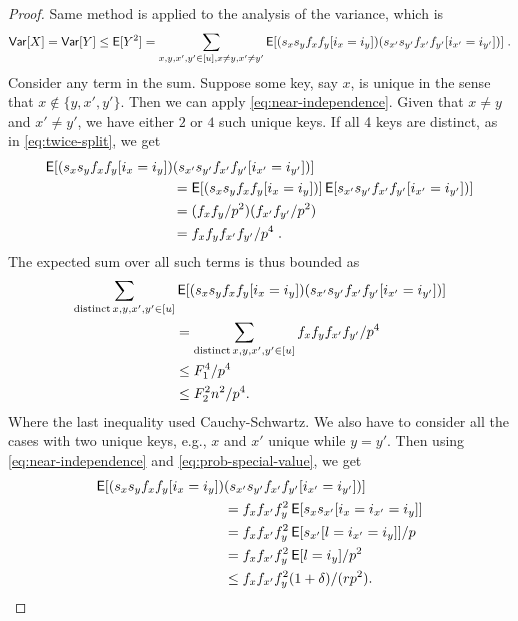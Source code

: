 \begin{proof}
    Same method is applied to the analysis of the variance, which is
    \[
        {\sf Var}[X]
            = {\sf Var}[Y]
            \le \operatorname*{\sf{E}}[Y^2]
            = \sum_{x,y,x',y' \in [u], x \neq y, x' \neq y'} \operatorname*{\sf{E}}[(s_x s_y f_x f_y [i_x = i_y]) (s_{x'} s_{y'} f_{x'} f_{y'}[i_{x'} = i_{y'}])]
        \; .
    \] 
    Consider any term in the sum. Suppose some key, say $x$, is unique in the
    sense that $x \not \in \{y,x',y'\}$. Then we can apply \cref{eq:near-independence}.
    Given that $x \neq y$ and $x'\neq y'$, we have either $2$ or $4$ such unique keys.
    If all 4 keys are distinct, as in \cref{eq:twice-split}, we get
    \begin{align*}
        \operatorname*{\sf{E}}[(s_x s_y f_x f_y [i_x = i_y]) &(s_{x'} s_{y'} f_{x'} f_{y'}[i_{x'} = i_{y'}])]
            \\&= \operatorname*{\sf{E}}[(s_x s_y f_x f_y [i_x = i_y])] \operatorname*{\sf{E}}[s_{x'} s_{y'} f_{x'} f_{y'}[i_{x'} = i_{y'}])]
            \\&= (f_x f_y/p^2)(f_{x'} f_{y'}/p^2)
            \\&= f_x f_y f_{x'} f_{y'}/p^4
        \; .
    \end{align*}
    The expected sum over all such terms is thus bounded
    as 
    \begin{equation}\begin{split}
        \sum_{{\rm distinct}\, x,y,x',y'\in[u]}& \operatorname*{\sf{E}}[(s_x s_y f_x f_y [i_x = i_y]) (s_{x'} s_{y'} f_{x'} f_{y'}[i_{x'} = i_{y'}])]
            \\&= \sum_{{\rm distinct}\,x,y,x',y'\in[u]} f_xf_yf_{x'}f_{y'}/p^4
            \\&\le F_1^4 /p^4
            \\&\le F_2^2 n^2/p^4.\label{eq:distinct}
    \end{split}\end{equation}
    Where the last inequality used Cauchy-Schwartz. We also have to consider all the cases with
    two unique keys, e.g., $x$ and $x'$ unique while $y=y'$. Then using \cref{eq:near-independence}
    and \cref{eq:prob-special-value}, we get
    \begin{align*}
        \E[(s_x s_y f_x f_y [i_x = i_y]) &(s_{x'} s_{y'} f_{x'} f_{y'}[i_{x'} = i_{y'}])]
            \\&= f_x f_{x'} f_y^2 \E[s_x s_{x'} [i_x = i_{x'} = i_y]]
            \\&= f_x f_{x'} f_y^2 \E[s_{x'} [l = i_{x'} = i_y]]/p
            \\&= f_x f_{x'} f_y^2 \E[l = i_y]/p^2
            \\&\le f_x f_{x'} f_y^2(1 + \delta)/(rp^2).

\end{align*}
\end{proof}
